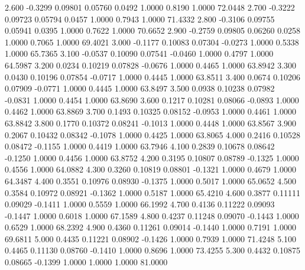    2.600  -0.3299   0.09801   0.05760   0.0492   1.0000   0.8190   1.0000  72.0448
   2.700  -0.3222   0.09723   0.05794   0.0457   1.0000   0.7943   1.0000  71.4332
   2.800  -0.3106   0.09755   0.05941   0.0395   1.0000   0.7622   1.0000  70.6652
   2.900  -0.2759   0.09805   0.06260   0.0258   1.0000   0.7065   1.0000  69.4021
   3.000  -0.1177   0.10083   0.07304  -0.0273   1.0000   0.5338   1.0000  65.7365
   3.100  -0.0537   0.10090   0.07541  -0.0460   1.0000   0.4797   1.0000  64.5987
   3.200   0.0234   0.10219   0.07828  -0.0676   1.0000   0.4465   1.0000  63.8942
   3.300   0.0430   0.10196   0.07854  -0.0717   1.0000   0.4445   1.0000  63.8511
   3.400   0.0674   0.10206   0.07909  -0.0771   1.0000   0.4445   1.0000  63.8497
   3.500   0.0938   0.10238   0.07982  -0.0831   1.0000   0.4454   1.0000  63.8690
   3.600   0.1217   0.10281   0.08066  -0.0893   1.0000   0.4462   1.0000  63.8869
   3.700   0.1493   0.10325   0.08152  -0.0953   1.0000   0.4461   1.0000  63.8842
   3.800   0.1770   0.10372   0.08241  -0.1013   1.0000   0.4448   1.0000  63.8567
   3.900   0.2067   0.10432   0.08342  -0.1078   1.0000   0.4425   1.0000  63.8065
   4.000   0.2416   0.10528   0.08472  -0.1155   1.0000   0.4419   1.0000  63.7946
   4.100   0.2839   0.10678   0.08642  -0.1250   1.0000   0.4456   1.0000  63.8752
   4.200   0.3195   0.10807   0.08789  -0.1325   1.0000   0.4556   1.0000  64.0882
   4.300   0.3260   0.10819   0.08801  -0.1321   1.0000   0.4679   1.0000  64.3487
   4.400   0.3551   0.10976   0.08930  -0.1375   1.0000   0.5017   1.0000  65.0652
   4.500   0.3584   0.10972   0.08921  -0.1362   1.0000   0.5187   1.0000  65.4210
   4.600   0.3877   0.11111   0.09029  -0.1411   1.0000   0.5559   1.0000  66.1992
   4.700   0.4136   0.11222   0.09093  -0.1447   1.0000   0.6018   1.0000  67.1589
   4.800   0.4237   0.11248   0.09070  -0.1443   1.0000   0.6529   1.0000  68.2392
   4.900   0.4360   0.11261   0.09014  -0.1440   1.0000   0.7191   1.0000  69.6811
   5.000   0.4435   0.11221   0.08902  -0.1426   1.0000   0.7939   1.0000  71.4248
   5.100   0.4465   0.11130   0.08760  -0.1410   1.0000   0.8696   1.0000  73.4255
   5.300   0.4432   0.10875   0.08665  -0.1399   1.0000   1.0000   1.0000  81.0000
